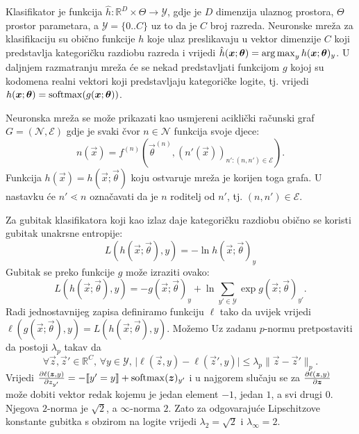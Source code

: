 \documentclass[utf8, seminar, numeric, lmodern]{feri}
\begin{document}
Klasifikator je funkcija $\hat{h}:\mathbb{R}^D\times{\varTheta} \to \mathcal{Y}$, gdje je $D$ dimenzija ulaznog prostora, $\Theta$ prostor parametara, a $\mathcal{Y}=\{0..C\}$ uz to da je $C$ broj razreda. Neuronske mreža za klasifikaciju su obično funkcije $h$ koje ulaz preslikavaju u vektor dimenzije $C$ koji predstavlja kategoričku razdiobu razreda i vrijedi $\hat{h}(\bm{x};\bm{\theta}) = \operatorname*{arg\,max}_y h(\bm{x};\bm{\theta})_y$. U daljnjem razmatranju mreža će se nekad predstavljati funkcijom $g$ kojoj su kodomena realni vektori koji predstavljaju kategoričke logite, tj. vrijedi $h(\bm{x};\bm{\theta}) = \operatorname{softmax}(g(\bm{x};\bm{\theta}))$.

Neuronska mreža se može prikazati kao usmjereni aciklički računski graf $G = (\mathcal{N}, \mathcal{E})$ gdje je svaki čvor $n\in\mathcal{N}$ funkcija svoje djece:
\begin{equation}
n(\vec x)=f^{(n)}(\vec\theta^{(n)}, (n'(\vec x))_{n':(n,n')\in\mathcal{E}}).
\end{equation}
Funkcija $h(\vec x) = h(\vec x;\vec\theta)$ koju ostvaruje mreža je korijen toga grafa. U nastavku će $n'\lessdot n$ označavati da je $n$ roditelj od $n'$, tj. $(n,n')\in\mathcal{E}$.

Za gubitak klasifikatora koji kao izlaz daje kategoričku razdiobu obično se koristi gubitak unakrsne entropije:
\begin{equation}
L(h(\vec x;\vec\theta), y) = -\ln h(\vec x;\vec\theta)_y
\end{equation}
Gubitak se preko funkcije $g$ može izraziti ovako:
\begin{equation}
L(h(\vec x;\vec\theta), y) = -g(\vec x;\vec\theta)_y + \ln \sum_{y'\in\mathcal{Y}}\exp g(\vec x;\vec\theta)_{y'}.
\end{equation}
Radi jednostavnijeg zapisa definiramo funkciju $\ell$ tako da uvijek vrijedi $\ell(g(\vec x;\vec\theta),y) = L(h(\vec x;\vec\theta),y)$. Možemo Uz zadanu $p$-normu pretpostaviti da postoji $\lambda_p$ takav da
\begin{equation}\label{eq:loss-lipschitz}
\forall \vec z, \vec z'\in \mathbb{R}^C,\, \forall y\in\mathcal{Y},\,
\lvert \ell(\vec z,y)-\ell(\vec z',y)\rvert 
\leq \lambda_p \lVert \vec z-\vec z'\rVert_p.
\end{equation}
Vrijedi $\frac{\partial \ell(\bm{z},y)}{\partial z_{y'}} = -\llbracket y'=y \rrbracket + \operatorname{softmax}(\bm{z})_{y'}$ i u najgorem slučaju se za $\frac{\partial \ell(\bm{z},y)}{\partial \bm{z}}$ može dobiti vektor redak kojemu je jedan element $-1$, jedan $1$, a svi drugi $0$. Njegova $2$-norma je $\sqrt 2$, a $\infty$-norma $2$. Zato za odgovarajuće Lipschitzove konstante gubitka s obzirom na logite vrijedi $\lambda_2=\sqrt 2$ i $\lambda_\infty=2$.
\end{document}
